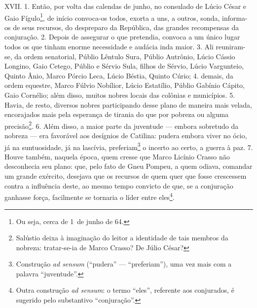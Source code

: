 XVII. 1. Então, por volta das calendas de junho, no consulado de Lúcio César e
Gaio Fígulo\footnote{Ou seja, cerca de 1\oi\ de junho de 64.}, de início
convoca-os todos, exorta a uns, a outros, sonda, informa-os de seus recursos,
do despreparo da República, das grandes recompensas da conjuração. 2. Depois de
assegurar o que pretendia, convoca a um único lugar todos os que tinham enorme
necessidade e audácia inda maior. 3. Ali reuniram-se, da ordem senatorial,
Públio Lêntulo Sura, Públio Autrônio, Lúcio Cássio Longino, Gaio Cetego, Públio
e Sérvio Sula, filhos de Sérvio, Lúcio Vargunteio, Quinto Ânio, Marco Pórcio
Leca, Lúcio Béstia, Quinto Cúrio; 4. demais, da ordem equestre, Marco Fúlvio
Nobílior, Lúcio Estatílio, Públio Gabínio Cápito, Gaio Cornélio; além disso,
muitos nobres locais das colônias e municípios. 5. Havia, de resto, diversos
nobres participando desse plano de maneira mais velada, encorajados mais pela
esperança de tirania do que por pobreza ou alguma precisão\footnote{Salústio
deixa à imaginação do leitor a identidade de tais membros da nobreza:
tratar-se-ia de Marco Crasso? De Júlio César?}. 6. Além disso, a maior parte da
juventude --- embora sobretudo da nobreza --- era favorável aos desígnios de
Catilina: pudera embora viver no ócio, já na suntuosidade, já na lascívia,
preferiam\footnote{Construção \emph{ad sensum} (``pudera'' --- ``preferiam''),
uma vez mais com a palavra ``juventude''.} o incerto ao certo, a guerra à paz.
7. Houve também, naquela época, quem cresse que Marco Licínio Crasso não
desconhecia seu plano: que, pelo fato de Gneu Pompeu, a quem odiava, comandar
um grande exército, desejava que os recursos de quem quer que fosse crescessem
contra a influência deste, ao mesmo tempo convicto de que, se a conjuração
ganhasse força, facilmente se tornaria o líder entre eles\footnote{Outra
construção \emph{ad sensum}: o termo ``eles'', referente aos conjurados, é
sugerido pelo substantivo ``conjuração''.}.

